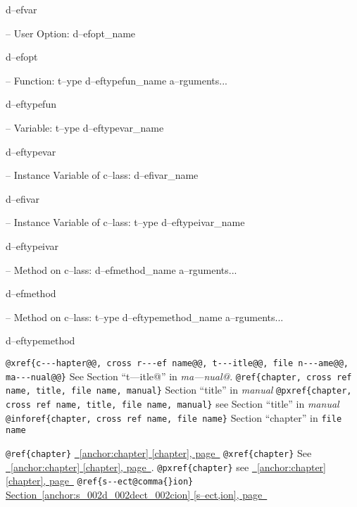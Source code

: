 \documentclass{book}
\begin{document}
%
d--efvar

\hbox{}-- User Option: d--efopt\_name


%
d--efopt

\hbox{}-- Function: t--ype d--eftypefun\_name a--rguments...


%
d--eftypefun

\hbox{}-- Variable: t--ype d--eftypevar\_name


%
d--eftypevar

\hbox{}-- Instance Variable of c--lass: d--efivar\_name


%
d--efivar

\hbox{}-- Instance Variable of c--lass: t--ype d--eftypeivar\_name


%
d--eftypeivar

\hbox{}-- Method on c--lass: d--efmethod\_name a--rguments...


%
d--efmethod

\hbox{}-- Method on c--lass: t--ype d--eftypemethod\_name a--rguments...


%
d--eftypemethod

\texttt{@xref\{c{-}{-}{-}hapter@@, cross r{-}{-}{-}ef name@@, t{-}{-}{-}itle@@, file n{-}{-}{-}ame@@, ma{-}{-}{-}nual@@\}} See Section ``t---itle@'' in \textit{ma---nual@}.
\texttt{@ref\{chapter, cross ref name, title, file name, manual\}} Section ``title'' in \textit{manual}
\texttt{@pxref\{chapter, cross ref name, title, file name, manual\}} see Section ``title'' in \textit{manual}
\texttt{@inforef\{chapter, cross ref name, file name\}} Section ``chapter'' in \texttt{file name}

\texttt{@ref\{chapter\}} \hyperref[anchor:chapter]{\chaptername~\ref*{anchor:chapter} [chapter], page~\pageref*{anchor:chapter}}
\texttt{@xref\{chapter\}} See \hyperref[anchor:chapter]{\chaptername~\ref*{anchor:chapter} [chapter], page~\pageref*{anchor:chapter}}.
\texttt{@pxref\{chapter\}} see \hyperref[anchor:chapter]{\chaptername~\ref*{anchor:chapter} [chapter], page~\pageref*{anchor:chapter}}
\texttt{@ref\{s{-}{-}ect@comma\{\}ion\}} \hyperref[anchor:s_002d_002dect_002cion]{Section~\ref*{anchor:s_002d_002dect_002cion} [s--ect,ion], page~\pageref*{anchor:s_002d_002dect_002cion}}
\end{document}
